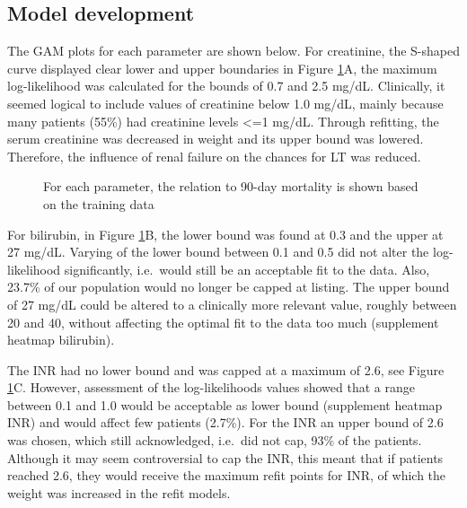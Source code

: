 \documentclass[11pt,english,]{book} %
\begin{document}
\hypertarget{model-development}{%
\subsection*{Model development}\label{model-development}}

The GAM plots for each parameter are shown below. For creatinine, the S-shaped curve displayed clear lower and upper boundaries in Figure \ref{fig:refit-fig1}A, the maximum log-likelihood was calculated for the bounds of 0.7 and 2.5 mg/dL. Clinically, it seemed logical to include values of creatinine below 1.0 mg/dL, mainly because many patients (55\%) had creatinine levels \textless=1 mg/dL. Through refitting, the serum creatinine was decreased in weight and its upper bound was lowered. Therefore, the influence of renal failure on the chances for LT was reduced.

\begin{figure}

{\centering {}\newline{}\newline{}

}

\caption{For each parameter, the relation to 90-day mortality is shown based on the training data}\label{fig:refit-fig1}
\end{figure}

For bilirubin, in Figure \ref{fig:refit-fig1}B, the lower bound was found at 0.3 and the upper at 27 mg/dL. Varying of the lower bound between 0.1 and 0.5 did not alter the log-likelihood significantly, i.e.~would still be an acceptable fit to the data. Also, 23.7\% of our population would no longer be capped at listing. The upper bound of 27 mg/dL could be altered to a clinically more relevant value, roughly between 20 and 40, without affecting the optimal fit to the data too much (supplement heatmap bilirubin).

The INR had no lower bound and was capped at a maximum of 2.6, see Figure \ref{fig:refit-fig1}C. However, assessment of the log-likelihoods values showed that a range between 0.1 and 1.0 would be acceptable as lower bound (supplement heatmap INR) and would affect few patients (2.7\%). For the INR an upper bound of 2.6 was chosen, which still acknowledged, i.e.~did not cap, 93\% of the patients. Although it may seem controversial to cap the INR, this meant that if patients reached 2.6, they would receive the maximum refit points for INR, of which the weight was increased in the refit models.
\end{document}
